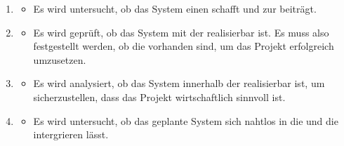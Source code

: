 \begin{infoBox}[title=Ziele der Machbarkeitsstudie:]
    \begin{enumerate}
        \item {}
        \begin{itemize}
            \item Es wird untersucht, ob das System einen  schafft und zur  beiträgt.
        \end{itemize}
        \item {}
        \begin{itemize}
            \item Es wird geprüft, ob das System mit der  realisierbar ist. Es muss also festgestellt werden, ob die  vorhanden sind, um das Projekt erfolgreich umzusetzen.
        \end{itemize}
        \item {}
        \begin{itemize}
            \item Es wird analysiert, ob das System innerhalb der  realisierbar ist, um sicherzustellen, dass das Projekt wirtschaftlich sinnvoll ist.
        \end{itemize}
        \item {}
        \begin{itemize}
            \item Es wird untersucht, ob das geplante System sich nahtlos in die  und die  intergrieren lässt.
        \end{itemize}
    \end{enumerate}
\end{infoBox}

